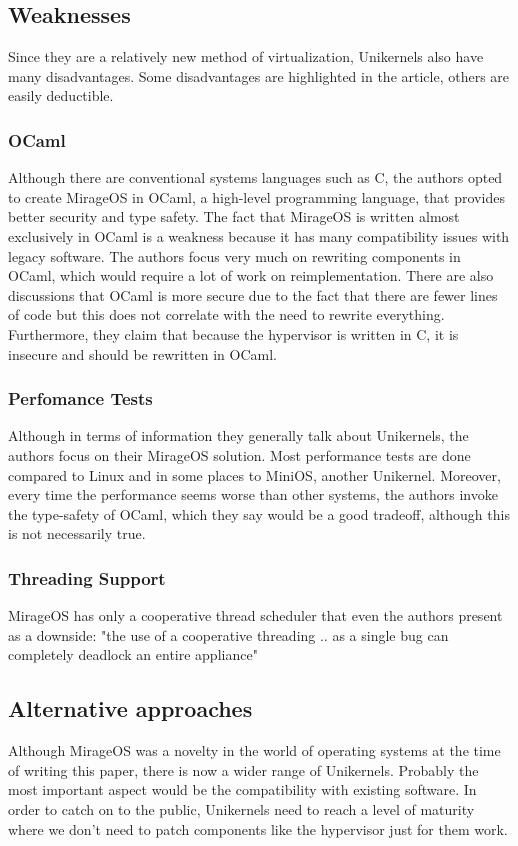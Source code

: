 \documentclass[12pt]{article}
\begin{document}
\subsection{Weaknesses}
Since they are a relatively new method of virtualization, Unikernels also have many disadvantages. Some disadvantages are highlighted in
the article, others are easily deductible.

\subsubsection{OCaml}
Although there are conventional systems languages such as C, the authors opted to create MirageOS in OCaml, a high-level programming language,
that provides better security and type safety. The fact that MirageOS is written almost exclusively in OCaml is a weakness because it has many
compatibility issues with legacy software. The authors focus very much on rewriting components in OCaml, which would require a lot of work on
reimplementation. There are also discussions that OCaml is more secure due to the fact that there are fewer lines of code but this does not
correlate with the need to rewrite everything. Furthermore, they claim that because the hypervisor is written in C, it is insecure and should
be rewritten in OCaml.

\subsubsection{Perfomance Tests}
Although in terms of information they generally talk about Unikernels, the authors focus on their MirageOS solution. Most performance tests are
done compared to Linux and in some places to MiniOS, another Unikernel.  Moreover, every time the performance seems worse than other systems, the
authors invoke the type-safety of OCaml, which they say would be a good tradeoff, although this is not necessarily true.

\subsubsection{Threading Support}
MirageOS has only a cooperative thread scheduler that even the authors present as a downside: "the use of a cooperative threading .. as a single bug
can completely deadlock an entire appliance"

\subsection{Alternative approaches}
Although MirageOS was a novelty in the world of operating systems at the time of writing this paper, there is now a wider range of Unikernels. Probably
the most important aspect would be the compatibility with existing software. In order to catch on to the public, Unikernels need to reach a level of
maturity where we don't need to patch components like the hypervisor just for them work.
\end{document}
